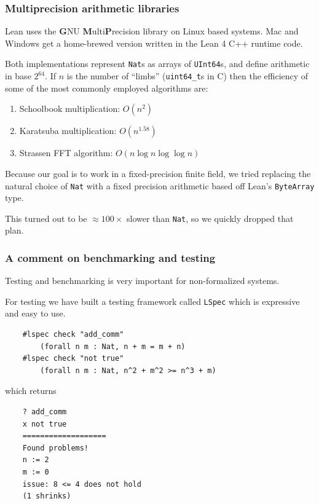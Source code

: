 \documentclass[options]{beamer}
\begin{document}
\begin{frame}[fragile]
    \frametitle{Multiprecision arithmetic libraries}

    Lean uses the {\bf G}NU {\bf M}ulti{\bf P}recision library on Linux based systems. Mac and Windows get a home-brewed version written in the Lean 4 C++ runtime code.

    Both implementations represent \verb+Nat+s as arrays of \verb+UInt64+s, and define arithmetic in base $2^{64}$. If $n$ is the number of ``limbs'' (\verb+uint64_t+s in C) then the efficiency of some of the most commonly employed algorithms are:

    \begin{enumerate}
        \item Schoolbook multiplication: $O(n^2)$

        \item Karatsuba multiplication: $O(n^{1.58})$
              
        \item Strassen FFT algorithm: $O(n \log n \log \log n)$
    \end{enumerate}

    Because our goal is to work in a fixed-precision finite field, we tried replacing the natural choice of \verb+Nat+ with a fixed precision arithmetic based off Lean's \verb+ByteArray+ type.

    This turned out to be $\approx 100 \times$ slower than \verb+Nat+, so we quickly dropped that plan.

\end{frame}

\begin{frame}[fragile]
    \frametitle{A comment on benchmarking and testing}

    Testing and benchmarking is very important for non-formalized systems.

    For testing we have built a testing framework called \verb+LSpec+ which is expressive and easy to use.

    \begin{verbatim}
    #lspec check "add_comm"
        (forall n m : Nat, n + m = m + n)
    #lspec check "not true" 
        (forall n m : Nat, n^2 + m^2 >= n^3 + m)
    \end{verbatim}

    which returns

    \begin{verbatim}
    ? add_comm
    x not true
    ===================
    Found problems!
    n := 2
    m := 0
    issue: 8 <= 4 does not hold
    (1 shrinks)
    \end{verbatim}
\end{frame}
\end{document}
